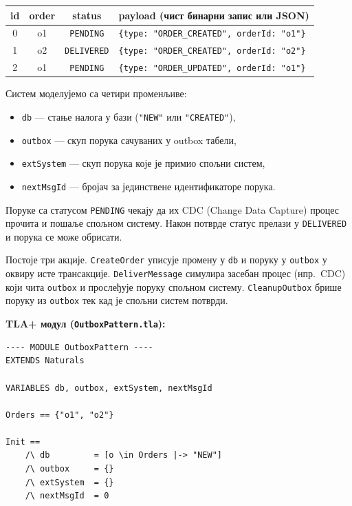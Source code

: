 \begin{center}
\begin{tabularx}{\textwidth}{|c|c|c|X|}
\hline
\textbf{id} & \textbf{order} & \textbf{status} & \textbf{payload (чист бинарни запис или JSON) } \\
\hline
0 & o1 & \texttt{PENDING}   & \texttt{\{type: "ORDER\_CREATED", orderId: "o1"\}} \\
1 & o2 & \texttt{DELIVERED} & \texttt{\{type: "ORDER\_CREATED", orderId: "o2"\}} \\
2 & o1 & \texttt{PENDING}   & \texttt{\{type: "ORDER\_UPDATED", orderId: "o1"\}} \\
\hline
\end{tabularx}
\end{center}

\begin{primer}
Систем моделујемо са четири променљиве:
\begin{itemize}
    \item \texttt{db} --- стање налога у бази (\texttt{"NEW"} или \texttt{"CREATED"}),
    \item \texttt{outbox} --- скуп порука сачуваних у outbox табели,
    \item \texttt{extSystem} --- скуп порука које је примио спољни систем,
    \item \texttt{nextMsgId} --- бројач за јединствене идентификаторе порука.
\end{itemize}


Поруке са статусом \texttt{PENDING} чекају да их CDC (Change Data Capture)  процес прочита и пошаље спољном систему.
Након потврде статус прелази у \texttt{DELIVERED} и порука се може обрисати.

Постоје три акције. \texttt{CreateOrder} уписује промену у \texttt{db} и поруку у \texttt{outbox} у оквиру исте трансакције.
\texttt{DeliverMessage} симулира засебан процес (нпр.\ CDC) који чита \texttt{outbox} и прослеђује поруку спољном систему.
\texttt{CleanupOutbox} брише поруку из \texttt{outbox} тек кад је спољни систем потврди.

\textbf{TLA+ модул (\texttt{OutboxPattern.tla}):}
\begin{lstlisting}
---- MODULE OutboxPattern ----
EXTENDS Naturals

VARIABLES db, outbox, extSystem, nextMsgId

Orders == {"o1", "o2"}

Init ==
    /\ db         = [o \in Orders |-> "NEW"]
    /\ outbox     = {}
    /\ extSystem  = {}
    /\ nextMsgId  = 0


\end{lstlisting}
\end{primer}
